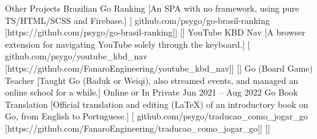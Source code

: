 \documentclass{llresume}
\begin{document}
\begin{mainpane}
    \begin{mainsection}{Other Projects}
        \entryGeneric
            {Brazilian Go Ranking}
            [An SPA with no framework, using pure TS/HTML/SCSS and Firebase.]
            [\infoGithub
                {github.com/psygo/go-brasil-ranking}
                [https://github.com/psygo/go-brasil-ranking]]
            []
        \entryGeneric
            {YouTube KBD Nav}
            [A browser extension for navigating YouTube solely through the keyboard.]
            [\infoGithub
                {github.com/psygo/youtube\_kbd\_nav}
                [https://github.com/FanaroEngineering/youtube\_kbd\_nav]]
            []
        \entryJob
            {Go (Board Game) Teacher}
            [Taught Go (Baduk or Weiqi), also streamed events, and managed an online school for a while.]
            {Online or In Private}
            {Jun 2021 -- Aug 2022}
        \entryGeneric
            {Go Book Translation}
            [Official translation and editing (\LaTeX) of an introductory book on Go, from English to Portuguese.]
            [\infoGithub
                {github.com/psygo/traducao\_como\_jogar\_go}
                [https://github.com/FanaroEngineering/traducao\_como\_jogar\_go]]
            []
    \end{mainsection}
\end{mainpane}
\end{document}
